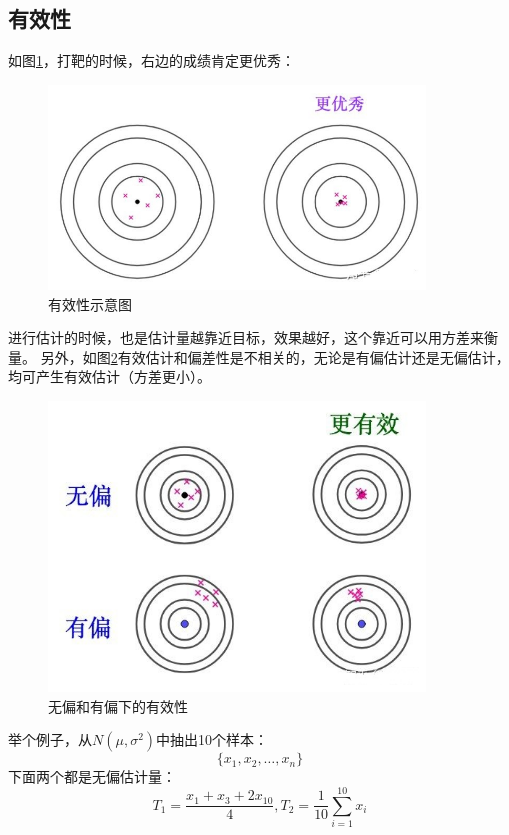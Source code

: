 \documentclass{article}
\begin{document}
\subsection{有效性}
如图\ref{figs:effective}，打靶的时候，右边的成绩肯定更优秀：
\begin{figure}[ht]
    \centering
    \includegraphics[width=10cm]{figure6.jpg}
    \caption{有效性示意图}
    \label{figs:effective}
\end{figure}
进行估计的时候，也是估计量越靠近目标，效果越好，这个靠近可以用方差来衡量。
另外，如图\ref{figs:effectiveOfbias}有效估计和偏差性是不相关的，无论是有偏估计还是无偏估计，
均可产生有效估计（方差更小）。
\begin{figure}[ht]
    \centering
    \includegraphics[width=10cm]{figure7.jpg}
    \caption{无偏和有偏下的有效性}
    \label{figs:effectiveOfbias}
\end{figure}
\par
举个例子，从$N(\mu,\sigma^2)$中抽出10个样本：
\begin{equation}
    \{x_1,x_2,\dots,x_n\}
\end{equation}
下面两个都是无偏估计量：
\begin{equation}
    T_1=\frac{x_1+x_3+2x_{10}}{4}, T_2=\frac{1}{10}\sum\limits_{i=1}^{10}{x_i}
\end{equation}
\end{document}
